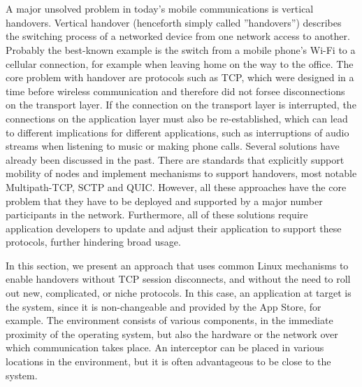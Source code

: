 \section{\wgh}
\label{sec:wg:impl}

\newcommand{\ld}{\texttt{LD\_PRELOAD}\xspace}

A major unsolved problem in today's mobile communications is vertical handovers.
Vertical handover (henceforth simply called ''handovers'') describes the switching process of a networked device from one network access to another.
Probably the best-known example is the switch from a mobile phone's Wi-Fi to a cellular connection, for example when leaving home on the way to the office.
The core problem with handover are protocols such as TCP, which were designed in a time before wireless communication and therefore did not forsee disconnections on the transport layer.
If the connection on the transport layer is interrupted, the connections on the application layer must also be re-established, which can lead to different implications for different applications, such as interruptions of audio streams when listening to music or making phone calls.
Several solutions have already been discussed in the past.
There are standards that explicitly support mobility of nodes and implement mechanisms to support handovers, most notable Multipath-TCP, SCTP and QUIC.
However, all these approaches have the core problem that they have to be deployed and supported by a major number participants in the network.
Furthermore, all of these solutions require application developers to update and adjust their application to support these protocols, further hindering broad usage.

In this section, we present an approach that uses common Linux mechanisms to enable handovers without TCP session disconnects, and without the need to roll out new, complicated, or niche protocols.
In this case, an application at target is the system, since it is non-changeable and provided by the App Store, for example.
The environment consists of various components, in the immediate proximity of the operating system, but also the hardware or the network over which communication takes place.
An interceptor can be placed in various locations in the environment, but it is often advantageous to be close to the system. 





